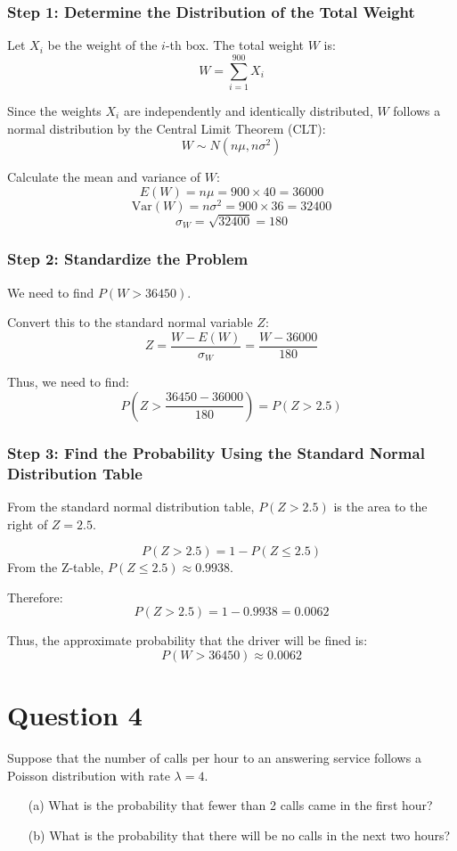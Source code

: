 \documentclass[12pt]{article}
\begin{document}
\subsubsection*{Step 1: Determine the Distribution of the Total Weight}
Let \( X_i \) be the weight of the \( i \)-th box. The total weight \( W \) is:
\[ W = \sum_{i=1}^{900} X_i \]

Since the weights \( X_i \) are independently and identically distributed, \( W \) follows a normal distribution by the Central Limit Theorem (CLT):
\[ W \sim N(n\mu, n\sigma^2) \]

Calculate the mean and variance of \( W \):
\[ E(W) = n\mu = 900 \times 40 = 36000 \]
\[ \text{Var}(W) = n\sigma^2 = 900 \times 36 = 32400 \]
\[ \sigma_W = \sqrt{32400} = 180 \]

\subsubsection*{Step 2: Standardize the Problem}
We need to find \( P(W > 36450) \).

Convert this to the standard normal variable \( Z \):
\[ Z = \frac{W - E(W)}{\sigma_W} = \frac{W - 36000}{180} \]

Thus, we need to find:
\[ P\left( Z > \frac{36450 - 36000}{180} \right) = P(Z > 2.5) \]

\subsubsection*{Step 3: Find the Probability Using the Standard Normal Distribution Table}
From the standard normal distribution table, \( P(Z > 2.5) \) is the area to the right of \( Z = 2.5 \).

\[
  P(Z > 2.5) = 1 - P(Z \leq 2.5)
\]
From the Z-table, \( P(Z \leq 2.5) \approx 0.9938 \).

Therefore:
\[
  P(Z > 2.5) = 1 - 0.9938 = 0.0062
\]

Thus, the approximate probability that the driver will be fined is:
\[ P(W > 36450) \approx 0.0062 \]


\newpage
\section*{Question 4}
Suppose that the number of calls per hour to an answering service follows a Poisson distribution with rate \( \lambda = 4 \).
\begin{itemize}
  \item[(a)] What is the probability that fewer than 2 calls came in the first hour?
  \item[(b)] What is the probability that there will be no calls in the next two hours?
\end{itemize}
\end{document}
